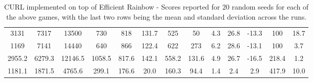 \begin{table}[!ht]
\begin{tabular}{c|c|c|c|c|c|c|c|c|c|c|c|c}
3131 &	7317 &	13500 &	730 &	818 &	131.7 &	525 &	50	 & 4.3	 & 26.8 &	-13.3 &	100 &	18.7 \\
1169 &	7141 &	14440 &	640 &	866 &	122.4 &	622 &	273 &	6.2 &	28.6 &	-13.1 &	100 &	3.7 \\
\hline
2955.2 & 6279.3 &	12146.5 &	1058.5 &	817.6 &	142.1 &	558.2 &	131.6 &	4.9 &	26.7 &	-16.5 &	218.4 & 1.2 \\
\hline
1181.1 & 1871.5 &	4765.6 &	299.1 &	176.6 &	20.0 &	160.3 &	94.4 &	1.4 &	2.4 & 2.9 & 417.9 &  10.0 \\
\hline
\end{tabular}
\vspace*{-0mm}
\caption{CURL implemented on top of Efficient Rainbow - Scores reported for $20$ random seeds for each of the above games, with the last two rows being the mean and standard deviation across the runs.}
\label{tab:atari2}
\vspace{-2mm}
\end{table}